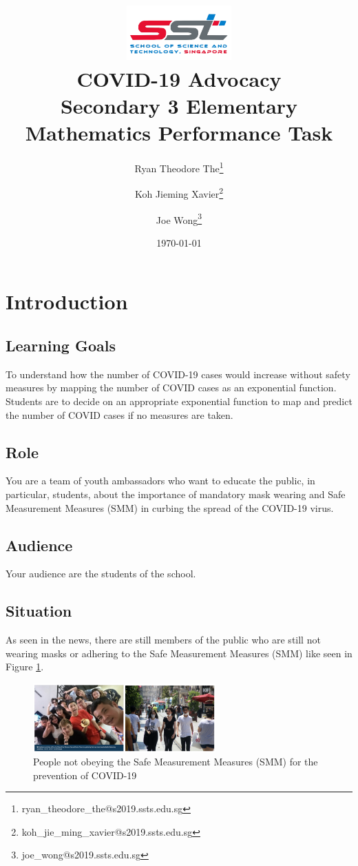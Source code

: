 \documentclass[a4paper,titlepage]{article}
\title{
\includegraphics[width=4cm]{sst.png}\\
\vspace{1cm}
\textbf{COVID-19 Advocacy}\\
{\large Secondary 3 Elementary Mathematics Performance Task}}
\author{Ryan Theodore The\thanks{ryan\_theodore\_the@s2019.ssts.edu.sg}}
\author{Koh Jieming Xavier\thanks{koh\_jie\_ming\_xavier@s2019.ssts.edu.sg}}
\author{Joe Wong\thanks{joe\_wong@s2019.ssts.edu.sg}}
\affil{School of Science and Technology, Singapore}
\date{\today}
\begin{document}
\maketitle

{\setlength{\parskip}{0pt}\tableofcontents}

\pagebreak
\section{Introduction}\label{sec:Introduction}

\subsection{Learning Goals}

To understand how the number of COVID-19 cases would increase without safety measures by mapping the number of COVID cases as an exponential function. Students are to decide on an appropriate exponential function to map and predict the number of COVID cases if no measures are taken.

\subsection{Role}

You are a team of youth ambassadors who want to educate the public, in particular, students, about the importance of mandatory mask wearing and Safe Measurement Measures (SMM) in curbing the spread of the COVID-19 virus.

\subsection{Audience}

Your audience are the students of the school. 

\subsection{Situation}

As seen in the news, there are still members of the public who are still not wearing masks or adhering to the Safe Measurement Measures (SMM) like seen in Figure \ref{fig:noSmm}.

\begin{figure}[htbp]
    \centering
    \includegraphics[width=7cm]{noSmm.png}
    \caption{People not obeying the Safe Measurement Measures (SMM) for the prevention of COVID-19}
    \label{fig:noSmm}
\end{figure}
\end{document}

